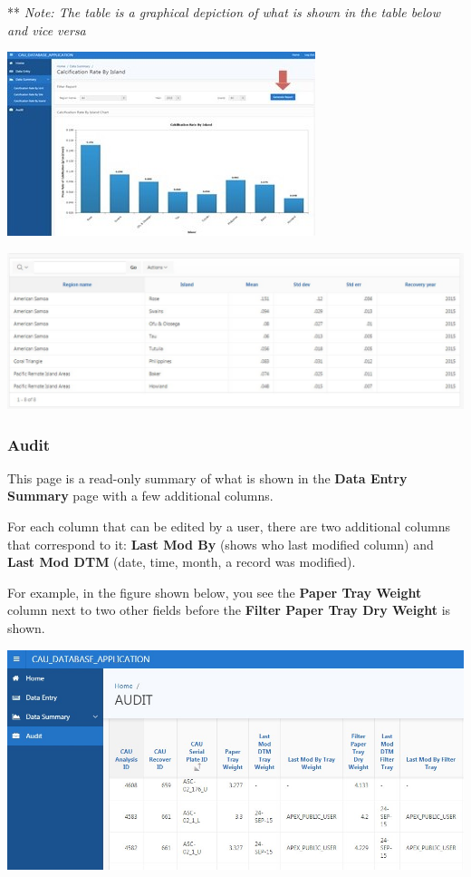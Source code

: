 \documentclass[]{book}
\begin{document}
** \emph{Note: The table is a graphical depiction of what is shown in the table below and vice versa}

\includegraphics{images/Data8.jpg}

\includegraphics{images/Data9.jpg}

\hypertarget{audit}{%
\subsubsection{Audit}\label{audit}}

This page is a read-only summary of what is shown in the \textbf{Data Entry Summary} page with a few additional columns.

For each column that can be edited by a user, there are two additional columns that correspond to it: \textbf{Last Mod By} (shows who last modified column) and \textbf{Last Mod DTM} (date, time, month, a record was modified).

For example, in the figure shown below, you see the \textbf{Paper Tray Weight} column next to two other fields before the \textbf{Filter Paper Tray Dry Weight} is shown.

\includegraphics{images/Data10.jpg}
\end{document}
